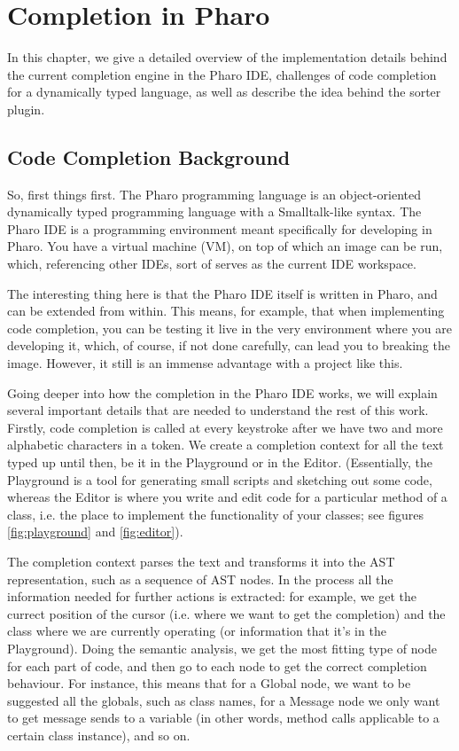 \chapter{Completion in Pharo}
\label{chap:Completion in Pharo}

In this chapter, we give a detailed overview of the implementation details behind the current completion engine in the Pharo IDE, challenges of code completion for a dynamically typed language, as well as describe the idea behind the sorter plugin.

\section{Code Completion Background}
So, first things first. The Pharo programming language is an object-oriented dynamically typed programming language with a Smalltalk-like syntax. The Pharo IDE is a programming environment meant specifically for developing in Pharo. You have a virtual machine (VM), on top of which an image can be run, which, referencing other IDEs, sort of serves as the current IDE workspace.

The interesting thing here is that the Pharo IDE itself is written in Pharo, and can be extended from within. This means, for example, that when implementing code completion, you can be testing it live in the very environment where you are developing it, which, of course, if not done carefully, can lead you to breaking the image. However, it still is an immense advantage with a project like this.

Going deeper into how the completion in the Pharo IDE works, we will explain several important details that are needed to understand the rest of this work. Firstly, code completion is called at every keystroke after we have two and more alphabetic characters in a token. We create a completion context for all the text typed up until then, be it in the Playground or in the Editor. (Essentially, the Playground is a tool for generating small scripts and sketching out some code, whereas the Editor is where you write and edit code for a particular method of a class, i.e. the place to implement the functionality of your classes; see figures \ref{fig:playground} and \ref{fig:editor}).

The completion context parses the text and transforms it into the AST representation, such as a sequence of AST nodes. In the process all the information needed for further actions is extracted: for example, we get the currect position of the cursor (i.e. where we want to get the completion) and the class where we are currently operating (or information that it's in the Playground). Doing the semantic analysis, we get the most fitting type of node for each part of code, and then go to each node to get the correct completion behaviour. For instance, this means that for a Global node, we want to be suggested all the globals, such as class names, for a Message node we only want to get message sends to a variable (in other words, method calls applicable to a certain class instance), and so on.

